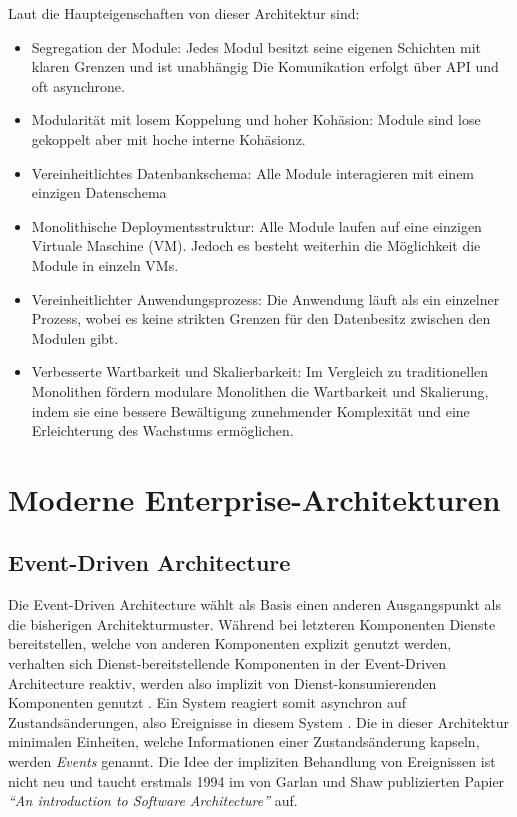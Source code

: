 \documentclass[acmtog]{acmart}
\begin{document}
Laut \cite{modular-mono2} die Haupteigenschaften von dieser Architektur sind:
\begin{itemize}
  \item Segregation der Module: Jedes Modul besitzt seine eigenen Schichten mit klaren Grenzen und ist unabhängig
    Die Komunikation erfolgt über API und oft asynchrone.
  \item Modularität mit losem Koppelung und hoher Kohäsion: Module sind lose gekoppelt aber mit hoche interne Kohäsionz. 
  \item Vereinheitlichtes Datenbankschema: Alle Module interagieren mit einem einzigen Datenschema
  \item Monolithische Deploymentsstruktur: Alle Module laufen auf eine einzigen Virtuale Maschine (VM). Jedoch es besteht weiterhin 
    die Möglichkeit die Module in einzeln VMs.
  \item Vereinheitlichter Anwendungsprozess: Die Anwendung läuft als ein einzelner Prozess, wobei es keine strikten Grenzen für den Datenbesitz zwischen den Modulen gibt.
  \item Verbesserte Wartbarkeit und Skalierbarkeit: Im Vergleich zu traditionellen Monolithen fördern modulare Monolithen die Wartbarkeit und Skalierung, indem sie eine bessere Bewältigung zunehmender Komplexität und eine Erleichterung des Wachstums ermöglichen.
\end{itemize}


\section{Moderne Enterprise-Architekturen}

\subsection{Event-Driven Architecture}
Die Event-Driven Architecture wählt als Basis einen anderen Ausgangspunkt als die bisherigen Architekturmuster.
Während bei letzteren Komponenten Dienste bereitstellen, welche von anderen Komponenten explizit genutzt werden,
verhalten sich Dienst-bereitstellende Komponenten in der Event-Driven Architecture reaktiv,
werden also implizit von Dienst-konsumierenden Komponenten genutzt \cite{garlanShawImplizit}.
Ein System reagiert somit asynchron auf Zustandsänderungen, also Ereignisse in diesem System \cite{eda}.
Die in dieser Architektur minimalen Einheiten, welche Informationen einer Zustandsänderung kapseln, werden \textit{Events} genannt.
Die Idee der impliziten Behandlung von Ereignissen ist nicht neu und taucht erstmals 1994 im von Garlan und Shaw publizierten Papier
\textit{\enquote{An introduction to Software Architecture}} auf.
\end{document}
